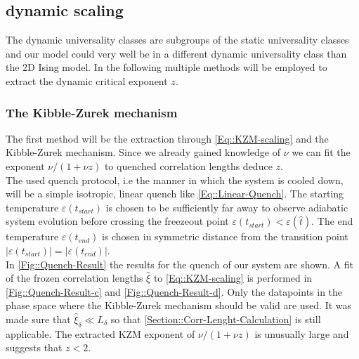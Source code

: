 	\subsection{dynamic scaling}
	The dynamic universality classes are subgroups of the static universality classes and our model could very well be in a different dynamic universality class than the 2D Ising model. In the following multiple methods will be employed to extract the dynamic critical exponent $z$. 
	
	\subsubsection{The Kibble-Zurek mechanism}
	The first method will be the extraction through \autoref{Eq::KZM-scaling} and the Kibble-Zurek mechanism. Since we already gained knowledge of $\nu$ we can fit the exponent $\nu /	(1 + \nu z)$ to quenched correlation lengths deduce $z$. \\
	
	The used quench protocol, i.e the manner in which the system is cooled down, will be a simple isotropic, linear quench like \autoref{Eq::Linear-Quench}. The starting temperature $\varepsilon(t_{start})$ is chosen to be sufficiently far away to observe adiabatic system evolution before crossing the freezeout point $\varepsilon(t_{start}) < \varepsilon(\hat{t})$. The end temperature $\varepsilon(t_{end})$ is chosen in symmetric distance from the transition point $|\varepsilon(t_{start})|=|\varepsilon(t_{end})|$. \\
	
	In \autoref{Fig::Quench-Result} the results for the quench of our system are shown. A fit of the frozen correlation lengths $\hat{\xi}$ to \autoref{Eq::KZM-scaling} is performed in \autoref{Fig::Quench-Result-c} and \autoref{Fig::Quench-Result-d}. Only the datapoints in the phase space where the Kibble-Zurek mechanism should be valid are used. It was made sure that $\hat{\xi}_\delta \ll L_\delta$ so that \autoref{Section::Corr-Lenght-Calculation} is still applicable. The extracted KZM exponent of $\nu /( 1 + \nu z)$ is unusually large and suggests that $z < 2$. \\
	
